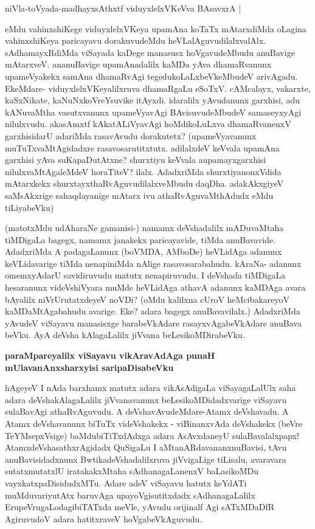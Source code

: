 \medskip
\begin{shloka}
niVla-toVyada-madhayxsAthxtf viduyxlelxVKeVva BAsavxrA |\label{166a}
\end{shloka}
\smallskip

\noindent
eMdu vahinxshiKege viduyxlelxVKeya upamAna koTaTx mAtarxdiMda oLagina vahinxshiKeya paricayavu dorakuvudeMdu heVLalAguvudilalxvalAlx. sAdhamayxRdiMda viSayada kaDege manasusx hoVgavudeMbudu anuBavige mAtarxveV. ananuBavige upamAnadalilx kaMDa yAva dhamaRvanunx upameVyakekx samAna dhamaRvAgi tegedukoLaLxbeVkeMbudeV arivAgadu. EkeMdare- viduyxlelxVKeyalilxruva dhamaRgaLu eSoTxV. cAMcalayx, vakarxte, kaSxNikate, kaNuNxkoVreYsuvike itAyxdi. idaralilx yAvudanunx garxhisi, adu kANuvaMtha vasutxvanunx upameVyavAgi BAvisuvudeMbudeV samaseyxyAgi nilulxvudu. akasAmxtf kAkatALiVyavAgi hoMdikoLuLxva dhamaRvanenxV garxhisidarU adariMda rasavAvudu dorakutetx? (upameVyavanunx muTuTxvaMtAgidadxre rasavosarutitxtutx. adilalxdeV keVvala upamAna garxhisi yAva suKapaDutAtxne? shurxtiyu keVvala aupamayxgarxhisi nilulxvaMtAgaleMdeV horaTiteV? ilalx. AdadxriMda shurxtiyanonxVdida mAtarxkekx shurxtayxthaRvAguvudilalxveMbudu daqDha. adakAkxgiyeV saMsAkxrige sahaqdayanige mAtarx ivu athaRvAguvaMthAdudx eMdu tiLiyabeVku)

\medskip

(matotxMdu udAharaNe gamanisi-) namamx deVshadalilx mADuvaMtaha tiMDigaLa bagegx, namamx janakekx paricayavide, tiMda anuBavavide. AdadxriMda A padagaLanunx (boVMDA, AMboDe) heVLidAga adanunx keVLidavarige tiMda nenapiniMda nAlige rasavosarabahudu. kAraNa- adanunx omemxyAdarU savidiruvudu matutx nenapiruvudu. I deVshada tiMDigaLa hesaranunx videVshiVyara muMde heVLidAga athavA adanunx kaMDAga avara bAyalilx niVrUrutatxdeyeV noVDi? (oMdu kalilxna cUroV heMcibakareyoV kaMDaMtAgabahudu avarige. Eke? adara bagegx anuBavavilalx.) AdadxriMda yAvudeV viSayavu manasisxge barabeVkAdare rasayxvAgabeVkAdare anuBava beVku. AyA deVsha kAlagaLalilx jiVvana beLesikoMDirabeVku.

{\bigskip
\noindent
{\large\bf paraMpareyalilx viSayavu vikAravAdAga punaH mUlavanAnxsharxyisi saripaDisabeVku}}\label{page167}
\medskip

\noindent
hAgeyeV I nAda barxhamx matutx adara vikAsAdigaLa viSayagaLalUlx saha adara deVshakAlagaLalilx jiVvanavanunx beLesikoMDidadxvarige viSayavu sulaBavAgi athaRvAguvudu. A deVshavAvudeMdare-Atamx deVshavadu. A Atamx deVshavanunx biTuTx \hbox{videVshakekx} - viBinanxvAda deVshakekx (beVre TeYMsepxVsige) baMdubiTiTxdAdxga adara AsAvxdaneyU sulaBavalalxpapx! AtamxdeVshasathxrAgidadx QuSigaLu I aMtanARdavananxnuBavisi, tAvu anuBavisidadxnunx BwtikadeVshadalilxruva jiVvigaLige tiLisalu, avaravara sutatxmutatxlU iratakakxMtaha sAdhanagaLanenxV baLasikoMDu vayxkatxpaDisidudxMTu. Adare adeV viSayavu hatutx keYdATi muMduvariyutAtx baruvAga upayoVgisutitxdadx sAdhanagaLalilx ErupeVrugaLodagibiTATxda meVle, yAvudu orijinalf Agi sATxMDaDfR AgiruvudoV adara hatitxraveV hoVgabeVkAguvudu.

